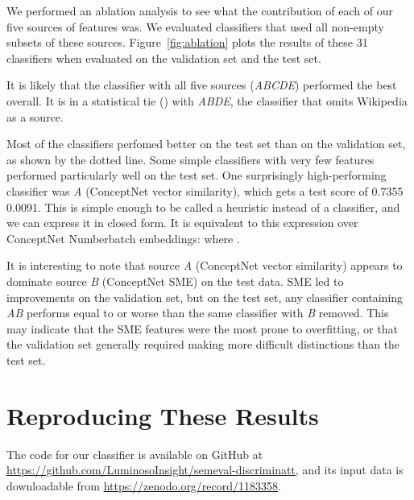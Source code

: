 \documentclass[11pt,a4paper]{article}
\begin{document}
We performed an ablation analysis to see what the contribution of each of our
five sources of features was. We evaluated classifiers that used all non-empty
subsets of these sources. Figure~\ref{fig:ablation} plots the results of these
31 classifiers when evaluated on the validation set and the test set.

It is likely that the classifier with all five sources (\emph{ABCDE}) performed the best
overall. It is in a statistical tie () with \emph{ABDE}, the classifier that
omits Wikipedia as a source.

Most of the classifiers perfomed better on the test set than on the validation
set, as shown by the dotted line. Some simple classifiers with very few
features performed particularly well on the test set. One surprisingly
high-performing classifier was \emph{A} (ConceptNet vector similarity), which
gets a test  score of 0.7355  0.0091. This is simple enough to be
called a heuristic instead of a classifier, and we can express it in closed
form. It is equivalent to this expression over ConceptNet Numberbatch
embeddings:  where .

It is interesting to note that source \emph{A} (ConceptNet vector similarity)
appears to dominate source \emph{B} (ConceptNet SME) on the test data. SME led
to improvements on the validation set, but on the test set, any classifier
containing \emph{AB} performs equal to or worse than the same classifier with
\emph{B} removed. This may indicate that the SME features were the most prone
to overfitting, or that the validation set generally required making more
difficult distinctions than the test set.

\section{Reproducing These Results}

The code for our classifier is available on GitHub at
\url{https://github.com/LuminosoInsight/semeval-discriminatt}, and its
input data is downloadable from \url{https://zenodo.org/record/1183358}.



\end{document}
